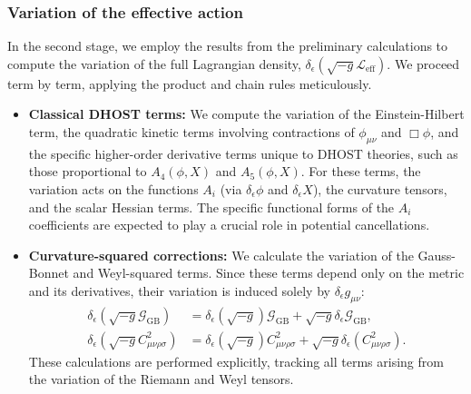 \documentclass[twocolumn]{aastex631}
\begin{document}
\subsubsection{Variation of the effective action}
In the second stage, we employ the results from the preliminary calculations to compute the variation of the full Lagrangian density, $\delta_\epsilon(\sqrt{-g}\mathcal{L}_{\text{eff}})$. We proceed term by term, applying the product and chain rules meticulously.
\begin{itemize}
    \item \textbf{Classical DHOST terms:} We compute the variation of the Einstein-Hilbert term, the quadratic kinetic terms involving contractions of $\phi_{\mu\nu}$ and $\Box\phi$, and the specific higher-order derivative terms unique to DHOST theories, such as those proportional to $A_4(\phi, X)$ and $A_5(\phi, X)$. For these terms, the variation acts on the functions $A_i$ (via $\delta_\epsilon \phi$ and $\delta_\epsilon X$), the curvature tensors, and the scalar Hessian terms. The specific functional forms of the $A_i$ coefficients are expected to play a crucial role in potential cancellations.

    \item \textbf{Curvature-squared corrections:} We calculate the variation of the Gauss-Bonnet and Weyl-squared terms. Since these terms depend only on the metric and its derivatives, their variation is induced solely by $\delta_\epsilon g_{\mu\nu}$:
    \begin{align}
        \delta_\epsilon(\sqrt{-g} \mathcal{G}_{\text{GB}}) &= \delta_\epsilon(\sqrt{-g}) \mathcal{G}_{\text{GB}} + \sqrt{-g} \delta_\epsilon \mathcal{G}_{\text{GB}}, \\
        \delta_\epsilon(\sqrt{-g} C_{\mu\nu\rho\sigma}^2) &= \delta_\epsilon(\sqrt{-g}) C_{\mu\nu\rho\sigma}^2 + \sqrt{-g} \delta_\epsilon (C_{\mu\nu\rho\sigma}^2).
    \end{align}
    These calculations are performed explicitly, tracking all terms arising from the variation of the Riemann and Weyl tensors.
\end{itemize}
\end{document}
